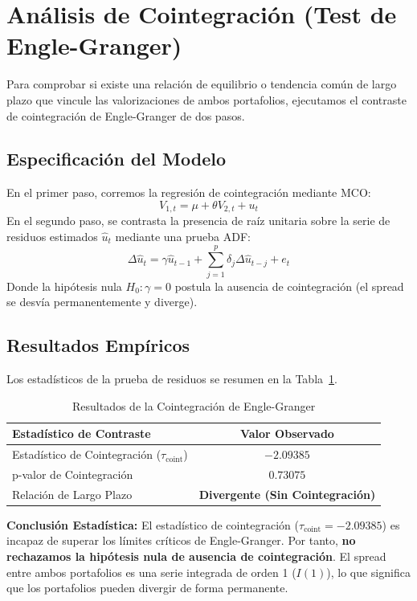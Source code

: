 \documentclass[11pt,a4paper]{article}
\begin{document}
\section{Análisis de Cointegración (Test de Engle-Granger)}
Para comprobar si existe una relación de equilibrio o tendencia común de largo plazo que vincule las valorizaciones de ambos portafolios, ejecutamos el contraste de cointegración de Engle-Granger de dos pasos.

\subsection{Especificación del Modelo}
En el primer paso, corremos la regresión de cointegración mediante MCO:
\begin{equation}
    V_{1,t} = \mu + \theta V_{2,t} + u_t
\end{equation}
En el segundo paso, se contrasta la presencia de raíz unitaria sobre la serie de residuos estimados $\hat{u}_t$ mediante una prueba ADF:
\begin{equation}
    \Delta \hat{u}_t = \gamma \hat{u}_{t-1} + \sum_{j=1}^{p} \delta_j \Delta \hat{u}_{t-j} + e_t
\end{equation}
Donde la hipótesis nula $H_0: \gamma = 0$ postula la ausencia de cointegración (el spread se desvía permanentemente y diverge).

\subsection{Resultados Empíricos}
Los estadísticos de la prueba de residuos se resumen en la Tabla~\ref{tab:coint}.

\begin{table}[h]
\centering
\caption{Resultados de la Cointegración de Engle-Granger}
\label{tab:coint}
\vspace{0.2cm}
\begin{tabular}{lc}
\toprule
\textbf{Estadístico de Contraste} & \textbf{Valor Observado} \\
\midrule
Estadístico de Cointegración ($\tau_{\text{coint}}$) & $-2.09385$ \\
p-valor de Cointegración & $0.73075$ \\
Relación de Largo Plazo & \textbf{Divergente (Sin Cointegración)} \\
\bottomrule
\end{tabular}
\end{table}

\textbf{Conclusión Estadística:} El estadístico de cointegración ($\tau_{\text{coint}} = -2.09385$) es incapaz de superar los límites críticos de Engle-Granger. Por tanto, \textbf{no rechazamos la hipótesis nula de ausencia de cointegración}. El spread entre ambos portafolios es una serie integrada de orden 1 ($I(1)$), lo que significa que los portafolios pueden divergir de forma permanente.
\end{document}
